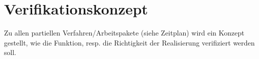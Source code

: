 \section{Verifikationskonzept}
Zu allen partiellen Verfahren/Arbeitspakete (siehe Zeitplan) wird ein Konzept gestellt, wie die Funktion, resp. die Richtigkeit der Realisierung verifiziert werden soll.